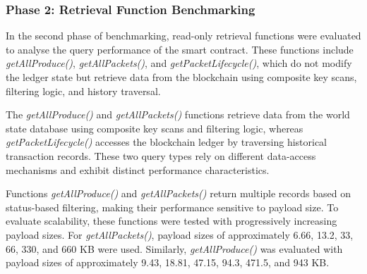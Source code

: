 \documentclass[12pt]{article}
\begin{document}
	\begin{table}[h]
		\centering
		\caption{Performance Results for \texttt{purchasePacket} (Payload: 40 bytes) under Varying Load}
		
		
		\label{tab:purchase-loadtest}
	\end{table}
	
	
	
	\subsubsection{Phase 2: Retrieval Function Benchmarking}
	
	In the second phase of benchmarking, read-only retrieval functions were evaluated to analyse the query performance of the smart contract. These functions include \textit{getAllProduce()}, \textit{getAllPackets()}, and \textit{getPacketLifecycle()}, which do not modify the ledger state but retrieve data from the blockchain using composite key scans, filtering logic, and history traversal.
	
	
	The \textit{getAllProduce()} and \textit{getAllPackets()} functions retrieve data from the world state database using composite key scans and filtering logic, whereas \textit{getPacketLifecycle()} accesses the blockchain ledger by traversing historical transaction records. These two query types rely on different data-access mechanisms and exhibit distinct performance characteristics.
	
	Functions \textit{getAllProduce()} and \textit{getAllPackets()} return multiple records based on status-based filtering, making their performance sensitive to payload size. To evaluate scalability, these functions were tested with progressively increasing payload sizes. For \textit{getAllPackets()}, payload sizes of approximately 6.66, 13.2, 33, 66, 330, and 660 KB were used. Similarly, \textit{getAllProduce()} was evaluated with payload sizes of approximately 9.43, 18.81, 47.15, 94.3, 471.5, and 943 KB.
	
\end{document}
